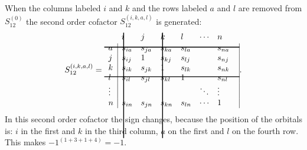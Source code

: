 When the columns labeled $i$ and $k$ and the rows labeled $a$ and $l$ are removed from $S_{12}^{(0)}$ the second order cofactor $S_{12}^{(i,k,a,l)}$ is generated:
\begin{equation}
S_{12}^{(i,k,a,l)} =
\begin{array}{lllllll}
 &  \hskip 2.0 pt \hbox{\lower 120pt\hbox{\vrule height128pt width 1.0pt}}\hskip-3.0pt i & j & \hskip 2.0 pt \hbox{\lower 120pt\hbox{\vrule height128pt width 1.0pt}}\hskip-3.0pt k & l & \cdots & n \\
\noalign{\vskip-115pt}
 a &  \multicolumn{1}{|l}{s_{ia}} & s_{ja}  & s_{ka} & s_{la} & & \multicolumn{1}{l|}{ s_{na} } \\
 \noalign{\vskip-8pt}
\multispan7\hbox{\vrule  height 1.0 pt width164pt}\cr
\noalign{\vskip 7pt}
 j & \multicolumn{1}{|l}{s_{ij}} & 1 & s_{kj} & s_{lj} & & \multicolumn{1}{l|}{s_{nj}} \\
 k & \multicolumn{1}{|l}{s_{ik}} & s_{jk} & 1 & s_{lk} & & \multicolumn{1}{l|}{s_{nk}} \\
 l & \multicolumn{1}{|l}{s_{il}} & s_{jl} & s_{kl} & 1 & & \multicolumn{1}{l|}{s_{nl}} \\
 \noalign{\vskip-8pt}
\multispan7\hbox{\vrule  height 1.0 pt width164pt}\cr
\noalign{\vskip 7pt}
 \vdots & \multicolumn{1}{|l}{ } &   &   & & \ddots & \multicolumn{1}{l|}{\vdots} \\
 n & \multicolumn{1}{|l}{ s_{in}} & s_{jn} & s_{kn} & s_{ln} & \cdots & \multicolumn{1}{l|}{1}
\end{array}.\\
\label{ch2.eq.socofac}
\end{equation}
In this second order cofactor the sign changes, because the position of the orbitals is: $i$ in the first and $k$ in the third column, $a$ on the first and $l$ on the fourth row. This makes $-1^{(1+3+1+4)} = -1$.



